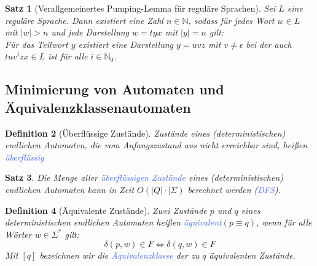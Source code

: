 \documentclass[11pt]{scrartcl}
\newcommand{\tcol}[1]{\textcolor{RoyalBlue}{#1}}
\theoremstyle{break}
\newtheorem{satz}{Satz}[section]
\newtheorem{defi}[satz]{Definition}
\begin{document}
    \begin{satz}[Verallgemeinertes Pumping-Lemma für reguläre Sprachen]
        Sei $L$ eine reguläre Sprache.
        Dann existiert eine Zahl $n\in\mathbb{N}$, sodass für jedes Wort $w\in L$ mit $|w|>n$ und jede Darstellung $w=tyx$ mit $|y|=n$ gilt:\\
        Für das Teilwort $y$ existiert eine Darstellung $y=uvz$ mit $v\neq\epsilon$ bei der auch $tuv^{i}zx\in L$ ist für alle $i\in\mathbb{N}_0$.
    \end{satz}


    \subsection{Minimierung von Automaten und Äquivalenzklassenautomaten}
	\label{subsec:minimierung-von-automaten-und-äquivalenzklassenautomaten}

    \begin{defi}[Überflüssige Zustände]
        Zustände eines (deterministischen) endlichen Automaten, die vom Anfangszustand aus nicht erreichbar sind, heißen \tcol{überflüssig}
    \end{defi}

    \begin{satz}
        Die Menge aller \tcol{überflüssigen Zustände} eines (deterministischen) endlichen Automaten kann in Zeit $O(|Q|\cdot |\Sigma)$ berechnet werden (\tcol{DFS}).
    \end{satz}

    \begin{defi}[Äquivalente Zustände]
        Zwei Zustände $p$ und $q$ eines deterministischen endlichen Automaten heißen \tcol{äquivalent}$(p\equiv q)$, wenn für alle Wörter $w\in\Sigma^*$ gilt:
        \[\delta(p,w)\in F\Leftrightarrow\delta(q,w)\in F\]
        Mit $[q]$ bezeichnen wir die \tcol{Äquivalenzklasse} der zu $q$ äquivalenten Zustände.
    \end{defi}
\end{document}
